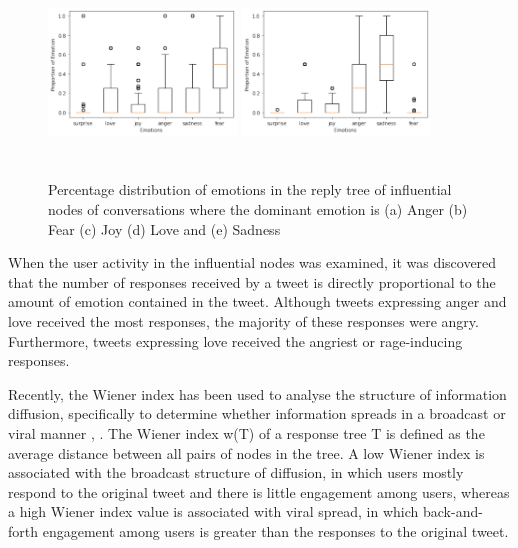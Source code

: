 \begin{figure}[h]
\begin{minipage}{.5\textwidth}
    \includegraphics[width=5cm,height=5.5cm,keepaspectratio]{plots/dis_love.pdf}
  \end{minipage}%
  \begin{minipage}{.5\textwidth}
    \centering
    \includegraphics[width=5cm,height=5.5cm,keepaspectratio]{plots/dis_sad.pdf}
  \end{minipage}
  
  \caption{Percentage distribution of emotions in the reply tree of influential nodes of conversations where the dominant emotion is (a) Anger (b) Fear (c) Joy (d) Love and (e) Sadness}
  \label{SampleConv}
  \end{figure}
When the user activity in the influential nodes was examined, it was discovered that the number of responses received by a tweet is directly proportional to the amount of emotion contained in the tweet. Although tweets expressing anger and love received the most responses, the majority of these responses were angry. Furthermore, tweets expressing love received the angriest or rage-inducing responses.

Recently, the Wiener index has been used to analyse the structure of information diffusion, specifically to determine whether information spreads in a broadcast or viral manner \cite{saveski2021structure}, \cite{goel2016structural}. The Wiener index w(T) of a response tree T is defined as the average distance between all pairs of nodes in the tree. A low Wiener index is associated with the broadcast structure of diffusion, in which users mostly respond to the original tweet and there is little engagement among users, whereas a high Wiener index value is associated with viral spread, in which back-and-forth engagement among users is greater than the responses to the original tweet. 

